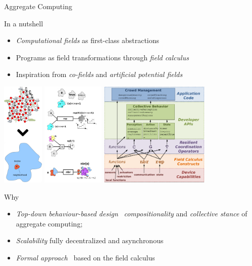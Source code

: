 \documentclass[presentation, 9pt]{beamer}\mode<presentation>{\usetheme{AMSBolognaFC}}
\begin{document}
\begin{frame}[allowframebreaks]{Aggregate Computing}
\begin{alertblock}{In a nutshell}
\begin{itemize}
	\item \emph{Computational fields} as first-class abstractions
	\item Programs as field transformations through \emph{field calculus} 
	\item Inspiration from \emph{co-fields} and \emph{artificial potential fields}
\end{itemize}
\end{alertblock}

\centering
\includegraphics[height=5cm]{img/abstraction.png}
\includegraphics[height=5cm]{img/high-level-examples.png}
\includegraphics[height=5cm]{img/full-stack.png}
\begin{block}{Why}
\begin{itemize}
	\item \emph{Top-down behaviour-based design} \faArrowRight \, \emph{compositionality} and \emph{collective stance} of aggregate computing;
	\item \emph{Scalability} \faArrowRight fully decentralized and asynchronous
	\item \emph{Formal approach} \faArrowRight \, based on the field calculus
		

\end{itemize}
\end{block}
\end{frame}
\end{document}
